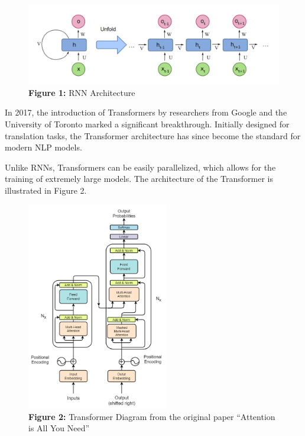 \begin{figure}[htbp]
  \centering
  \includegraphics[width=1\textwidth]{images/RNN.png}
  \caption*{\textbf{Figure 1:} RNN Architecture} %
  \label{fig:rnn_architecture}
\end{figure}

In 2017, the introduction of Transformers by researchers from Google and the University of Toronto marked a significant breakthrough. Initially designed for translation tasks, the Transformer architecture has since become the standard for modern NLP models.

Unlike RNNs, Transformers can be easily parallelized, which allows for the training of extremely large models. The architecture of the Transformer is illustrated in Figure 2.

\begin{figure}[H]
  \centering
  \includegraphics[width=0.55\textwidth]{images/Transformer Architecture.png}
  \caption*{\textbf{Figure 2:} Transformer Diagram from the original paper ``Attention is All You Need''} %
  \label{fig:transformer_architecture}
\end{figure}

